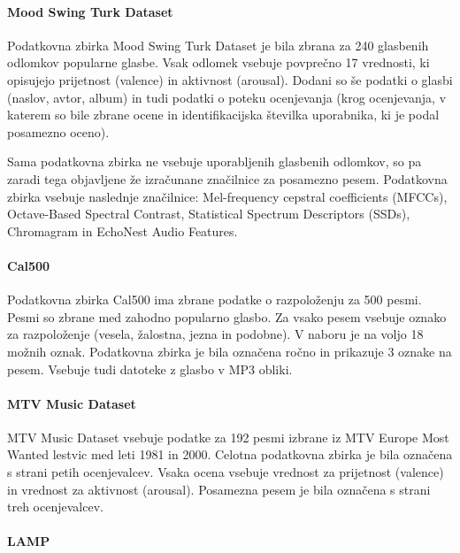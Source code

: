 \documentclass[a4paper, 12pt]{book}
\begin{document}
{\paragraph{Mood Swing Turk Dataset}

Podatkovna zbirka Mood Swing Turk Dataset \cite{schmidt2011modeling} je bila zbrana za 240 glasbenih odlomkov popularne glasbe. Vsak odlomek vsebuje povprečno 17 vrednosti, ki opisujejo prijetnost (valence) in aktivnost (arousal). Dodani so še podatki o glasbi (naslov, avtor, album) in tudi podatki o poteku ocenjevanja (krog ocenjevanja, v katerem so bile zbrane ocene in identifikacijska številka uporabnika, ki je podal posamezno oceno). 

Sama podatkovna zbirka ne vsebuje uporabljenih glasbenih odlomkov, so pa zaradi tega objavljene že izračunane značilnice za posamezno pesem. Podatkovna zbirka vsebuje naslednje značilnice: Mel-frequency cepstral coefficients (MFCCs), Octave-Based Spectral Contrast, Statistical Spectrum Descriptors (SSDs), Chromagram in EchoNest Audio Features.

\paragraph{Cal500}

Podatkovna zbirka Cal500 \cite{turnbull2008semantic} ima zbrane podatke o razpoloženju za 500 pesmi. Pesmi so zbrane med zahodno popularno glasbo. Za vsako pesem vsebuje oznako za razpoloženje (vesela, žalostna, jezna in podobne). V naboru je na voljo 18 možnih oznak. Podatkovna zbirka je bila označena ročno in prikazuje 3 oznake na pesem. Vsebuje tudi datoteke z glasbo v MP3 obliki.

\paragraph{MTV Music Dataset}

MTV Music Dataset \cite{schuller2010mister} vsebuje podatke za 192 pesmi izbrane iz MTV Europe Most Wanted lestvic med leti 1981 in 2000. Celotna podatkovna zbirka je bila označena s strani petih ocenjevalcev. Vsaka ocena vsebuje vrednost za prijetnost (valence) in vrednost za aktivnost (arousal). Posamezna pesem je bila označena s strani treh ocenjevalcev.

\paragraph{LAMP}

}
\end{document}
